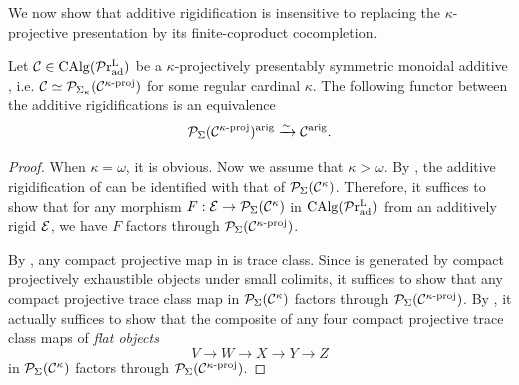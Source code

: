 \documentclass[a4paper,10pt, oneside]{amsart}
\begin{document}
	We now show that additive rigidification is insensitive to replacing the \(\kappa\)-projective presentation by its finite-coproduct cocompletion.
	\begin{prop}\label{addrigidificationkappaproj}
		
		Let $\mathcal{C}\in\operatorname{CAlg}(\mathcal{P}\mathrm{r}_{\mathrm{ad}}^\mathrm{L})$ be a $\kappa$-projectively presentably symmetric monoidal additive \infcat, i.e. $\mathcal{C}\simeq\mathcal{P}_{\Sigma_\kappa}(\mathcal{C}^{\kappa\text{-}\mathrm{proj}})$ for some regular cardinal $\kappa$. The following functor between the additive rigidifications is an equivalence
		$$\mathcal{P}_{\Sigma}(\mathcal{C}^{\kappa\text{-}\mathrm{proj}})^{\mathrm{arig}}\xrightarrow{\sim}\mathcal{C}^{\mathrm{arig}}.$$
	\end{prop}
	\begin{proof}
		When $\kappa=\omega$, it is obvious. Now we assume that $\kappa>\omega$. By \cite[Lemma 4.71]{ramzi2024locally}, the additive rigidification of \mcc can be identified with that of $\mathcal{P}_{\Sigma}(\mathcal{C}^{\kappa})$. Therefore, it suffices to show that for  any morphism $F:\mathcal{E} \to \mathcal{P}_{\Sigma}(\mathcal{C}^{\kappa})$ in $\operatorname{CAlg}(\mathcal{P}\mathrm{r}_{\mathrm{ad}}^\mathrm{L})$ from an additively rigid \infcat $\mathcal{E}$, we have $F$ factors through $\mathcal{P}_{\Sigma}(\mathcal{C}^{\kappa\text{-}\mathrm{proj}})$. 
		
		By \cite[Corollary 4.14]{ramzi2024locally}, any compact projective map in \mce is trace class. Since \mce is generated by compact projectively exhaustible objects under small colimits, it suffices to show that any compact projective trace class  map in $\mathcal{P}_{\Sigma}(\mathcal{C}^{\kappa})$ factors through $\mathcal{P}_{\Sigma}(\mathcal{C}^{\kappa\text{-}\mathrm{proj}})$.
		By \cite[Addendum 2.42]{ramzi2024dualizable}, it actually suffices to show that the composite of any four compact projective trace class  maps of \emph{flat objects} $$V\to W\to X\to Y \to Z$$ in $\mathcal{P}_{\Sigma}(\mathcal{C}^{\kappa})$  factors through $\mathcal{P}_{\Sigma}(\mathcal{C}^{\kappa\text{-}\mathrm{proj}})$.
		

\end{proof}
\end{document}
